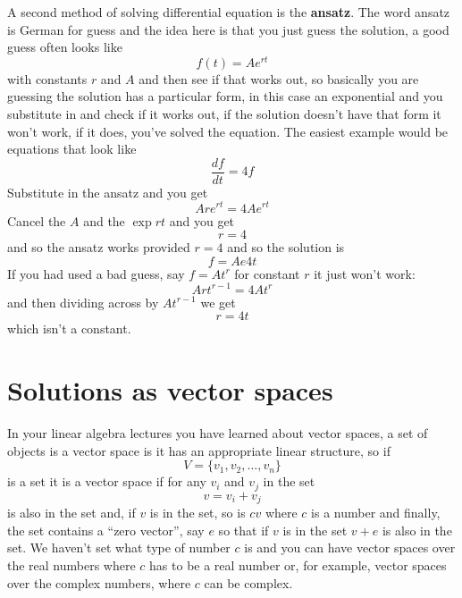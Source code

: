 \documentclass[12pt]{article}
\begin{document}
A second method of solving differential equation is the
\textbf{ansatz}. The word ansatz is German for guess and the idea here is that you just guess the solution, a good guess often looks like
\begin{equation}
  f(t)=Ae^{rt}
\end{equation}
with constants $r$ and $A$ and then see if that works out, so basically you are guessing the solution has a particular form, in this case an exponential and you substitute in and check if it works out, if the solution doesn't have that form it won't work, if it does, you've solved the equation. The easiest example would be equations that look like
\begin{equation}
  \frac{df}{dt}=4f
\end{equation}
Substitute in the ansatz and you get
\begin{equation}
  Are^{rt}=4Ae^{rt}
\end{equation}
Cancel the $A$ and the $\exp{rt}$ and you get
\begin{equation}
  r=4
\end{equation}
and so the ansatz works provided $r=4$ and so the solution is
\begin{equation}
  f=Ae{4t}
\end{equation}
If you had used a bad guess, say $f=At^r$ for constant $r$ it just won't work:
\begin{equation}
  Art^{r-1}=4At^r
\end{equation}
and then dividing across by $At^{r-1}$ we get
\begin{equation}
  r=4t
\end{equation}
which isn't a constant.

\section*{Solutions as vector spaces}

In your linear algebra lectures you have learned about vector spaces, a set of objects is a vector space is it has an appropriate linear structure, so if
\begin{equation}
  V=\{v_1,v_2,\ldots,v_n\}
\end{equation}
is a set it is a vector space if for any $v_i$ and $v_j$ in the set
\begin{equation}
  v=v_i+v_j
\end{equation}
is also in the set and, if $v$ is in the set, so is $cv$ where $c$ is
a number and finally, the set contains a ``zero vector'', say $e$ so
that if $v$ is in the set $v+e$ is also in the set. We haven't set
what type of number $c$ is and you can have vector spaces over the
real numbers where $c$ has to be a real number or, for example, vector
spaces over the complex numbers, where $c$ can be complex.
\end{document}
